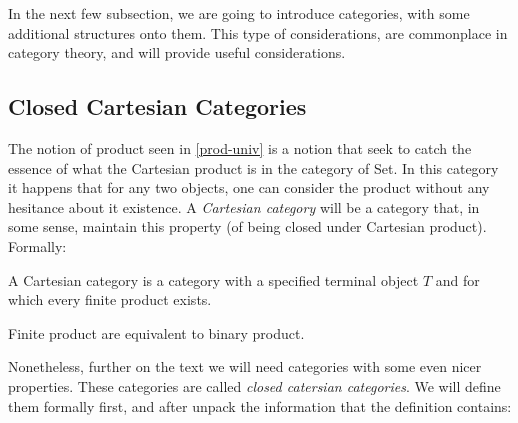 In the next few subsection, we are going to introduce categories, with some additional structures onto them. This type of considerations, are commonplace in category theory, and will provide useful considerations.




\subsection{Closed Cartesian Categories}\label{subsect:CCC}

The notion of product seen in \ref{prod-univ} is a notion that seek to catch the essence of what the Cartesian product is in the category of Set. In this category it happens that for any two objects, one can consider the product without any hesitance about it existence. A \emph{Cartesian category} will be a category that, in some sense, maintain this property (of being closed under Cartesian product). Formally: 
\begin{definition}
  A Cartesian category is a category with a specified terminal object $T$ and for which every finite product exists.
\end{definition}
\begin{remark}
  Finite product are equivalent to binary product.
\end{remark}

Nonetheless, further on the text we will need categories with some even nicer properties. These categories are called \emph{closed catersian categories}. We will define them formally first, and after unpack the information that the definition contains:

